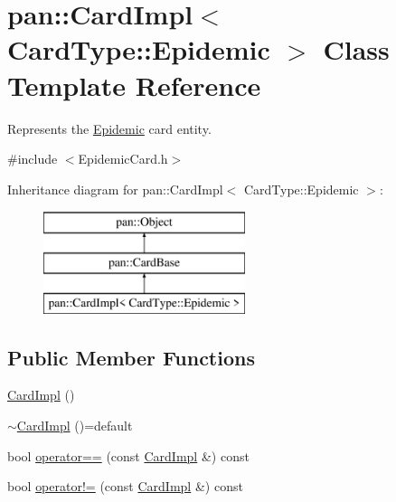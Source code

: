 \hypertarget{classpan_1_1_card_impl_3_01_card_type_1_1_epidemic_01_4}{}\section{pan\+:\+:Card\+Impl$<$ Card\+Type\+:\+:Epidemic $>$ Class Template Reference}
\label{classpan_1_1_card_impl_3_01_card_type_1_1_epidemic_01_4}


Represents the \hyperlink{classpan_1_1_epidemic}{Epidemic} card entity.  




{\ttfamily \#include $<$Epidemic\+Card.\+h$>$}

Inheritance diagram for pan\+:\+:Card\+Impl$<$ Card\+Type\+:\+:Epidemic $>$\+:\begin{figure}[H]
\begin{center}
\leavevmode
\includegraphics[height=3.000000cm]{classpan_1_1_card_impl_3_01_card_type_1_1_epidemic_01_4}
\end{center}
\end{figure}
\subsection*{Public Member Functions}
\begin{DoxyCompactItemize}
\item 
\hyperlink{classpan_1_1_card_impl_3_01_card_type_1_1_epidemic_01_4_a19cabff4b96d1931e1ef0332c28eee92}{Card\+Impl} ()
\item 
\hyperlink{classpan_1_1_card_impl_3_01_card_type_1_1_epidemic_01_4_a1af8f6b83d5ff973c3480854e0ee290d}{$\sim$\+Card\+Impl} ()=default
\item 
bool \hyperlink{classpan_1_1_card_impl_3_01_card_type_1_1_epidemic_01_4_a90424e537b2e228c367f1b107cc39e4c}{operator==} (const \hyperlink{classpan_1_1_card_impl}{Card\+Impl} \&) const
\item 
bool \hyperlink{classpan_1_1_card_impl_3_01_card_type_1_1_epidemic_01_4_a812d96882f6e80e71260ca7fef95f421}{operator!=} (const \hyperlink{classpan_1_1_card_impl}{Card\+Impl} \&) const
\end{DoxyCompactItemize}
